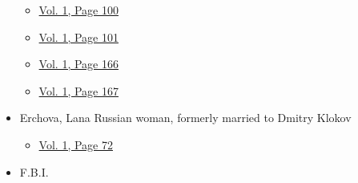\begin{itemize}
  \begin{itemize}
  \tightlist
  \item
    \protect\hyperlink{g-page-108}{Vol. 1, Page 100}
  \item
    \protect\hyperlink{g-page-109}{Vol. 1, Page 101}
  \item
    \protect\hyperlink{g-page-174}{Vol. 1, Page 166}
  \item
    \protect\hyperlink{g-page-175}{Vol. 1, Page 167}
  \end{itemize}
\item
  Erchova, Lana Russian woman, formerly married to Dmitry Klokov

  \begin{itemize}
  \tightlist
  \item
    \protect\hyperlink{g-page-80}{Vol. 1, Page 72}
  \end{itemize}
\item
  F.B.I.


\end{itemize}
